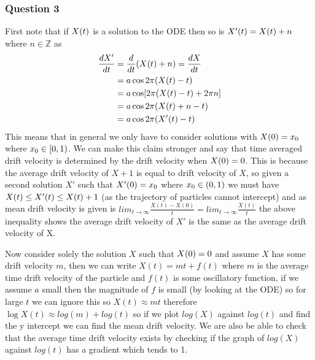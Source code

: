 \documentclass[11pt]{article} %
\let\originalleft\left
\let\originalright\right
\renewcommand{\left}{\mathopen{}\mathclose\bgroup\originalleft}
\renewcommand{\right}{\aftergroup\egroup\originalright}
\begin{document}
\subsubsection*{Question 3}

First note that if $X\left( t \right)$ is a solution to the ODE then so is $X'\left( t \right) = X\left( t \right) + n$ where $n \in \mathbb{Z}$ as
\begin{align*}
	\frac{dX'}{dt} = {} &  \frac{d}{dt}\left(X\left(t\right) + n\right) = \frac{dX}{dt} \\
			  = {} & a \cos 2\pi \left( X\left( t \right) - t \right) \\
			  = {} & a \cos \left[ 2\pi \left( X\left( t \right) - t \right) + 2\pi n\right] \\
			  = {} & a \cos 2\pi \left( X\left( t \right) + n - t \right) \\
			  = {} & a \cos 2\pi \left( X'\left( t \right) - t \right)
\end{align*}
This means that in general we only have to consider solutions with $X\left(0\right)=x_0$ where $x_0 \in \left[0,1\right)$. We can make this claim stronger and say that time averaged drift velocity is determined by the drift velocity when $X\left(0\right)=0$. This is because the average drift velocity of $X+1$ is equal to drift velocity of $X$, so given a second solution $X'$ such that $X'\left(0\right)=x_0$ where $x_0 \in \left(0, 1\right)$ we must have $X\left(t\right) \leq X'\left(t\right) \leq X\left(t\right)+1$ (as the trajectory of particles cannot intercept) and as mean drift velocity is given is $lim_{t \to \infty}{\frac{X(t)-X(0)}{t}}=lim_{t \to \infty}{\frac{X(t)}{t}}$ the above inequality shows the average drift velocity of $X'$ is the same as the average drift velocity of X.

Now consider solely the solution $X$ such that $X\left(0\right)=0$ and assume $X$ has some drift velocity $m$, then we can write $X(t) = mt + f(t)$ where $m$ is the average time drift velocity of the particle and $f(t)$ is some oscillatory function, if we assume $a$ small then the magnitude of $f$ is small (by looking at the ODE) so for large $t$ we can ignore this so $X(t) \approx mt$ therefore $\log{X(t)} \approx log(m) + log(t)$ so if we plot $log(X)$ against $log(t)$ and find the y intercept we can find the mean drift velocity. We are also be able to check that the average time drift velocity exists by checking if the graph of $log(X)$ against $log(t)$ has a gradient which tends to 1.
\end{document}
